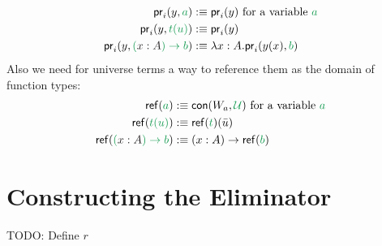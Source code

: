 \begin{defn}
\begin{align*}
\pr_i(y, \grm{a}) &:\equiv \pr_i(y) \text{ for a variable \grm{a}} \\
\pr_i(y, \grm{t(u)}) &:\equiv \pr_i(y) \\ %
\pr_i(y, \grm{(\blm{x : A}) \to b}) &:\equiv \lambda x : A. \pr_i(y(x), \grm{b})
\end{align*}
Also we need for universe terms a way to reference them as the domain of function
types:
\begin{align*}
\mathsf{ref}(\grm{a}) &:\equiv \contwo{W_a}{\UU} \text{ for a variable \grm{a}} \\
\mathsf{ref}(\grm{t(u)}) &:\equiv \mathsf{ref}(\grm{t})(\bar{u}) \\
\mathsf{ref}(\grm{(\blm{x : A}) \to b}) &:\equiv (x : A) \to \mathsf{ref}(\grm{b})
\end{align*}
\end{defn}

\section{Constructing the Eliminator}

TODO: Define $r$
